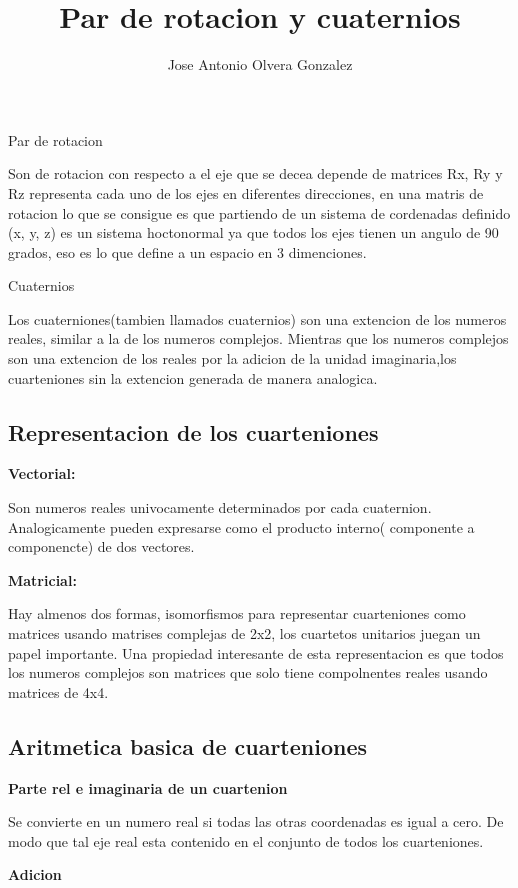 \documentclass[10pt,a4paper]{report}
\author{Jose Antonio Olvera Gonzalez }
\title{ Par de rotacion y cuaternios}
\begin{document}
\begin{center}
 Par de rotacion
\end{center}
\begin{flushleft}
Son  de rotacion con respecto a el eje que se decea depende de matrices Rx, Ry y Rz representa cada uno de los ejes en diferentes direcciones, en una matris de rotacion lo que se consigue es que partiendo de un sistema de cordenadas definido (x, y, z) es un sistema hoctonormal ya que todos los ejes tienen un angulo de 90 grados, eso es lo que define a un espacio en 3 dimenciones.
\end{flushleft}
\begin{center}
Cuaternios
\begin{flushleft}
Los cuaterniones(tambien llamados cuaternios) son una extencion de los numeros reales, similar a la de los numeros complejos. Mientras que los numeros complejos son una extencion de los reales por la adicion de la unidad imaginaria,los cuarteniones sin la extencion generada de manera analogica.
\subsection{Representacion de los cuarteniones }
\begin{flushleft}
\textbf{Vectorial:}
\begin{flushleft}
Son numeros reales univocamente determinados por cada cuaternion. Analogicamente pueden expresarse como el producto interno( componente a componencte) de dos vectores.
\begin{flushleft}
\textbf{Matricial:}
\begin{flushleft}
Hay almenos dos formas, isomorfismos para representar cuarteniones como matrices usando matrises complejas de 2x2, los cuartetos unitarios juegan un papel importante. Una propiedad interesante de esta representacion es que todos los numeros complejos son matrices que solo tiene compolnentes reales  usando matrices de 4x4.
\subsection{Aritmetica basica de cuarteniones}
\textbf{Parte rel e imaginaria de un cuartenion}

\begin{flushleft}
Se convierte en un numero real si todas las otras coordenadas es igual a cero. De modo que tal eje real esta contenido en el conjunto de todos los cuarteniones. 
\begin{flushleft}
\textbf{Adicion}


\end{flushleft}
\end{flushleft}
\end{flushleft}
\end{flushleft}
\end{flushleft}
\end{flushleft}
\end{flushleft}
\end{center}
\end{document}
